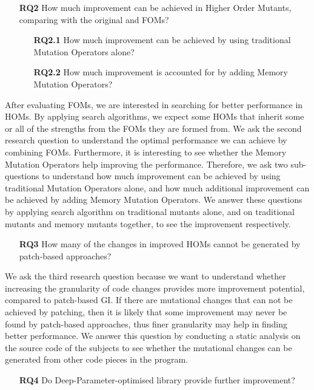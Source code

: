 \documentclass[oribibl]{llncs}
\begin{document}
\begin{enumerate}
\item[\textbf{RQ2}] How much improvement can be achieved in Higher Order Mutants, comparing with the original and FOMs?
\begin{enumerate}
\item[\textbf{RQ2.1}] How much improvement can be achieved by using traditional Mutation Operators alone?
\item[\textbf{RQ2.2}] How much improvement is accounted for by adding Memory Mutation Operators?
\end{enumerate}
\end{enumerate}

After evaluating FOMs, we are interested in searching for better performance in HOMs.
By applying search algorithms, we expect some HOMs that inherit some or all of the strengths from the FOMs they are formed from.
We ask the second research question to understand the optimal performance we can achieve by combining FOMs.
Furthermore, it is interesting to see whether the Memory Mutation Operators help improving the performance.
Therefore, we ask two sub-questions to understand how much improvement can be achieved by using traditional Mutation Operators alone, and how much additional improvement can be achieved by adding Memory Mutation Operators.
We answer these questions by applying search algorithm on traditional mutants alone, and on traditional mutants and memory mutants together, to see the improvement respectively.

\begin{enumerate}
\item[\textbf{RQ3}] How many of the changes in improved HOMs cannot be generated by patch-based approaches?
\end{enumerate}

We ask the third research question because we want to understand whether increasing the granularity of code changes provides more improvement potential, compared to patch-based GI.
If there are mutational changes that can not be achieved by patching, then it is likely that some improvement may never be found by patch-based approaches, thus finer granularity may help in finding better performance.
We answer this question by conducting a static analysis on the source code of the subjects to see whether the mutational changes can be generated from other code pieces in the program.

\begin{enumerate}
\item[\textbf{RQ4}] Do Deep-Parameter-optimised library provide further improvement?
\end{enumerate}
\end{document}
